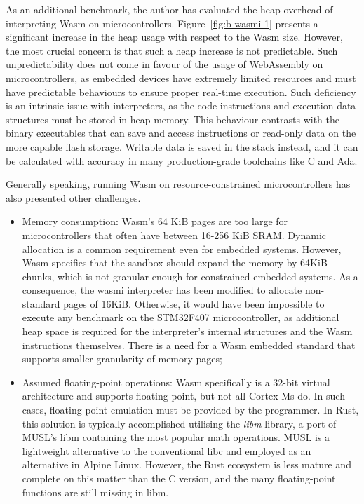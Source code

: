 As an additional benchmark, the author has evaluated the heap overhead of interpreting Wasm on microcontrollers. 
Figure~\ref{fig:b-wasmi-1} presents a significant increase in the heap usage with respect to the Wasm size. However, the most crucial concern is that such a heap increase is not predictable. Such unpredictability does not come in favour of the usage of WebAssembly on microcontrollers, as embedded devices have extremely limited resources and must have predictable behaviours to ensure proper real-time execution. Such deficiency is an intrinsic issue with interpreters, as the code instructions and execution data structures must be stored in heap memory. This behaviour contrasts with the binary executables that can save and access instructions or read-only data on the more capable flash storage. Writable data is saved in the stack instead, and it can be calculated with accuracy in many production-grade toolchains like C and Ada.

Generally speaking, running Wasm on resource-constrained microcontrollers has also presented other challenges.

\begin{itemize}
    \item Memory consumption: Wasm's 64 KiB pages are too large for microcontrollers that often have between 16-256 KiB SRAM. Dynamic allocation is a common requirement even for embedded systems. However, Wasm specifies that the sandbox should expand the memory by 64KiB chunks, which is not granular enough for constrained embedded systems. As a consequence, the wasmi interpreter has been modified to allocate non-standard pages of 16KiB. Otherwise, it would have been impossible to execute any benchmark on the STM32F407 microcontroller, as additional heap space is required for the interpreter's internal structures and the Wasm instructions themselves. There is a need for a Wasm embedded standard that supports smaller granularity of memory pages;
    \item Assumed floating-point operations: Wasm specifically is a 32-bit virtual architecture and supports floating-point, but not all Cortex-Ms do. In such cases, floating-point emulation must be provided by the programmer. In Rust, this solution is typically accomplished utilising the \emph{libm} library, a port of MUSL's libm containing the most popular math operations. MUSL is a lightweight alternative to the conventional libc and employed as an alternative in Alpine Linux. However, the Rust ecosystem is less mature and complete on this matter than the C version, and the many floating-point functions are still missing in libm. 
\end{itemize}

